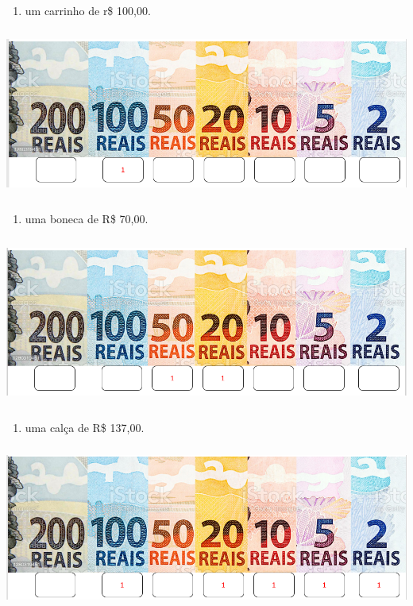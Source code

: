 \begin{enumerate}
\def\labelenumi{\Alph{enumi})}
\item
  um carrinho de r\$ 100,00.
\end{enumerate}

\includegraphics[width=5.90556in,height=2.19028in]{media/image65.png}

\begin{enumerate}
\def\labelenumi{\Alph{enumi})}
\item
  uma boneca de R\$ 70,00.
\end{enumerate}

\includegraphics[width=5.90556in,height=2.18611in]{media/image66.png}

\begin{enumerate}
\def\labelenumi{\Alph{enumi})}
\item
  uma calça de R\$ 137,00.
\end{enumerate}

\includegraphics[width=5.90556in,height=2.12778in]{media/image67.png}

